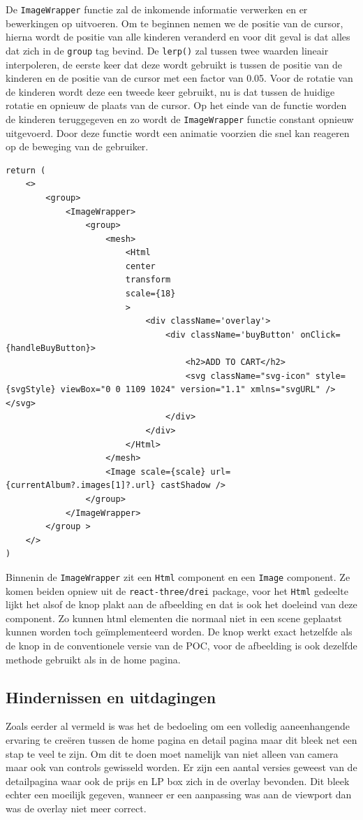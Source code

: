 De \texttt{ImageWrapper} functie zal de inkomende informatie verwerken en er bewerkingen op uitvoeren. Om te beginnen nemen we de positie van de cursor, hierna wordt de positie van alle kinderen veranderd en voor dit geval is dat alles dat zich in de \texttt{group} tag bevind. De \texttt{lerp()} zal tussen twee waarden lineair interpoleren, de eerste keer dat deze wordt gebruikt is tussen de positie van de kinderen en de positie van de cursor met een factor van 0.05. Voor de rotatie van de kinderen wordt deze een tweede keer gebruikt, nu is dat tussen de huidige rotatie en opnieuw de plaats van de cursor. Op het einde van de functie worden de kinderen teruggegeven en zo wordt de \texttt{ImageWrapper} functie constant opnieuw uitgevoerd. Door deze functie wordt een animatie voorzien die snel kan reageren op de beweging van de gebruiker.

\begin{lstlisting}
return (
	<>
		<group>
			<ImageWrapper>
				<group>
					<mesh>
						<Html
						center
						transform
						scale={18}
						>
							<div className='overlay'>
								<div className='buyButton' onClick={handleBuyButton}>
									<h2>ADD TO CART</h2>
									<svg className="svg-icon" style={svgStyle} viewBox="0 0 1109 1024" version="1.1" xmlns="svgURL" /></svg>
								</div>
							</div>
						</Html>
					</mesh>
					<Image scale={scale} url={currentAlbum?.images[1]?.url} castShadow />
				</group>
			</ImageWrapper>
		</group >
	</>
)
\end{lstlisting}

Binnenin de \texttt{ImageWrapper} zit een \texttt{Html} component en een \texttt{Image} component. Ze komen beiden opniew uit de \texttt{react-three/drei} package, voor het \texttt{Html} gedeelte lijkt het alsof de knop plakt aan de afbeelding en dat is ook het doeleind van deze component. Zo kunnen html elementen die normaal niet in een scene geplaatst kunnen worden toch geïmplementeerd worden. De knop werkt exact hetzelfde als de knop in de conventionele versie van de POC, voor de afbeelding is ook dezelfde methode gebruikt als in de home pagina.

\subsection{Hindernissen en uitdagingen}

Zoals eerder al vermeld is was het de bedoeling om een volledig aaneenhangende ervaring te creëren tussen de home pagina en detail pagina maar dit bleek net een stap te veel te zijn. Om dit te doen moet namelijk van niet alleen van camera maar ook van controls gewisseld worden. Er zijn een aantal versies geweest van de detailpagina waar ook de prijs en LP box zich in de overlay bevonden. Dit bleek echter een moeilijk gegeven, wanneer er een aanpassing was aan de viewport dan was de overlay niet meer correct.

